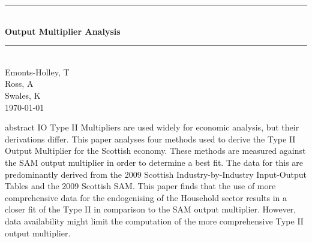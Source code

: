 \documentclass[11pt,a4paper]{report}
\numberwithin{figure}{section}
\numberwithin{table}{section}
\numberwithin{equation}{section}
\begin{document}

\begin{titlepage}
\thispagestyle{empty}
\newcommand{\HRule}{\rule{\linewidth}{0.00mm}} 
\center 
\HRule \\[0.4cm]
{ \huge \bfseries Output Multiplier Analysis}\\[0.4cm] 
\HRule \\[3.5cm]
{\small Emonts-Holley, T\\Ross, A\\Swales, K} \\ [4cm] 
{\small \today}\\[3cm] %
\vfill 
\end{titlepage}


abstract 
IO Type II Multipliers are used widely for economic analysis, but their derivations differ. This paper analyses four methods used to derive the Type II Output Multiplier for the Scottish economy. These methods are measured against the SAM output multiplier in order to determine a best fit. The data for this are predominantly derived from the 2009 Scottish Industry-by-Industry Input-Output Tables and the 2009 Scottish SAM. This paper finds that the use of more comprehensive data for the endogenising of the Household sector results in a closer fit of the Type II in comparison to the SAM output multiplier. However, data availability might limit the computation of the more comprehensive Type II output multiplier.


\end{document}
